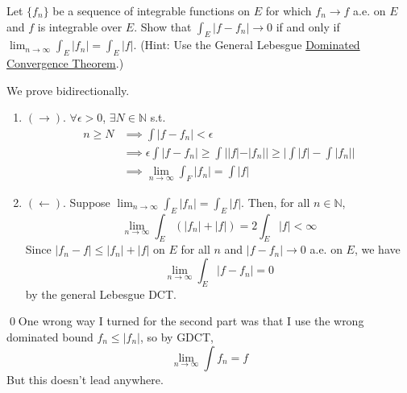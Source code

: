   \begin{exercise}[Royden 4.33]
    Let $\{f_n\}$ be a sequence of integrable functions on $E$ for which $f_n \to f$ a.e. on $E$ and $f$ is integrable over $E$. Show that $\int_E |f - f_n| \to 0$ if and only if $\lim_{n \to \infty} \int_E |f_n| = \int_E |f|$. (Hint: Use the General Lebesgue \hyperref[thm:dominated-convergence-theorem]{Dominated Convergence Theorem}.)
  \end{exercise}
  \begin{solution}
    We prove bidirectionally. 
    \begin{enumerate}
      \item $(\rightarrow)$. $\forall \epsilon > 0$, $\exists N \in \mathbb{N}$ s.t. 
        \begin{align}
          n \geq N & \implies \int |f - f_n| < \epsilon \\ 
                   & \implies \epsilon \int |f - f_n| \geq \int | |f| - |f_n|| \geq \bigg| \int |f| - \int |f_n| \bigg| \\ 
                   & \implies \lim_{n \to \infty} \int_F |f_n| = \int |f| 
        \end{align}

      \item $(\leftarrow)$. Suppose $\lim_{n\to\infty} \int_E |f_n| = \int_E |f|$. Then, for all $n \in \mathbb{N}$,
      \begin{equation}
        \lim_{n\to\infty} \int_E (|f_n| + |f|) = 2\int_E |f| < \infty
      \end{equation}
      Since $|f_n - f| \leq |f_n| + |f|$ on $E$ for all $n$ and $|f - f_n| \to 0$ a.e. on $E$, we have
      \begin{equation}
        \lim_{n\to\infty} \int_E |f - f_n| = 0
      \end{equation}
      by the general Lebesgue DCT. 
    \end{enumerate}
    \qed One wrong way I turned for the second part was that I use the wrong dominated bound $f_n \leq |f_n|$, so by GDCT, 
    \begin{equation}
      \lim_{n \to \infty} \int f_n = f
    \end{equation}
    But this doesn't lead anywhere. 
  \end{solution}

